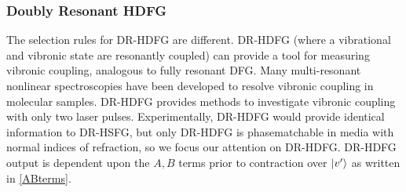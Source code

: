 \documentclass[aip, jcp, reprint, onecolumn]{revtex4-2}
\begin{document}
\subsubsection{Doubly Resonant HDFG}
The selection rules for DR-HDFG are different. 
DR-HDFG (where a vibrational and vibronic state are resonantly coupled) can provide a tool for measuring vibronic coupling, analogous to fully resonant DFG. \cite{Dick83_1, Shen94}
Many multi-resonant nonlinear spectroscopies have been developed to resolve vibronic coupling in molecular samples. \cite{Carlson1990, Gaynor2017, RN276}
DR-HDFG provides methods to investigate vibronic coupling with only two laser pulses.
Experimentally, DR-HDFG would provide identical information to DR-HSFG, but only DR-HDFG is phasematchable in media with normal indices of refraction, so we focus our attention on DR-HDFG. \cite{RN278}
DR-HDFG output is dependent upon the $A,B$ terms prior to contraction over $\ket{v'}$ as written in \autoref{ABterms}. 
\end{document}

